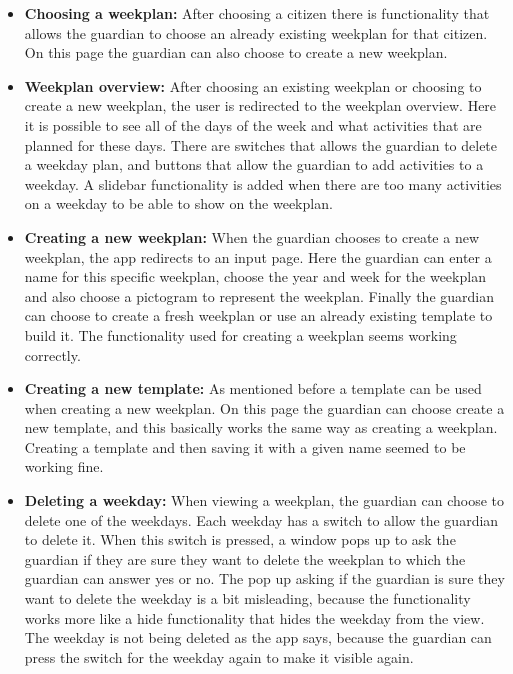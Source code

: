 \begin{itemize}
    \item \textbf{Choosing a weekplan:} After choosing a citizen there is functionality that allows the guardian to choose an already existing weekplan for that citizen.
    On this page the guardian can also choose to create a new weekplan.
    \\
    \item \textbf{Weekplan overview:} After choosing an existing weekplan or choosing to create a new weekplan, the user is redirected to the weekplan overview.
    Here it is possible to see all of the days of the week and what activities that are planned for these days.
    There are switches that allows the guardian to delete a weekday plan, and buttons that allow the guardian to add activities to a weekday.
    A slidebar functionality is added when there are too many activities on a weekday to be able to show on the weekplan.
    \\
    \item \textbf{Creating a new weekplan:} When the guardian chooses to create a new weekplan, the app redirects to an input page.
    Here the guardian can enter a name for this specific weekplan, choose the year and week for the weekplan and also choose a pictogram to represent the weekplan.
    Finally the guardian can choose to create a fresh weekplan or use an already existing template to build it. The functionality used for creating a weekplan seems working correctly.
    \\
    \item \textbf{Creating a new template:} As mentioned before a template can be used when creating a new weekplan.
    On this page the guardian can choose create a new template, and this basically works the same way as creating a weekplan.
    Creating a template and then saving it with a given name seemed to be working fine.
    \\
    \item \textbf{Deleting a weekday:} When viewing a weekplan, the guardian can choose to delete one of the weekdays. Each weekday has a switch to allow the guardian to delete it.
    When this switch is pressed, a window pops up to ask the guardian if they are sure they want to delete the weekplan to which the guardian can answer yes or no.
    The pop up asking if the guardian is sure they want to delete the weekday is a bit misleading, because the functionality works more like a hide functionality that hides the weekday from the view.
    The weekday is not being deleted as the app says, because the guardian can press the switch for the weekday again to make it visible again.

\end{itemize}
